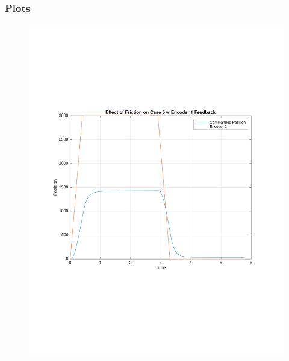 \documentclass[11pt, a4paper]{article}
\begin{document}
\subsubsection{Plots}
\begin{figure}[H]
\centering
\includegraphics[width = \textwidth]{4_fric.pdf}
\end{figure}
\end{document}
